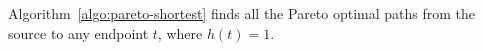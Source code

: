 \begin{comment}
Lastly, let us prove the correctness of Algorithm~\ref{algo:pareto-shortest}. Given a recourse point $t$, we need to establish two key points:

\begin{enumerate}
    \item  All pareto optimal paths from $s$ to $t$ are present in the pareto table $D^\eta_t$.
    \item  All paths in the pareto table $D^\eta_t$ are pareto optimal.
\end{enumerate}

The second statement is clearly true since the prune step is to compare the path one by one and delete the path if it is dominated. To prove the first statement, consider a path $Q$ which is pareto optimal but it is not included in $D^\eta_t$ in the end. If the number of edges in $Q$ is one, in the first iteration it must can be found when examining $(s,t)$ of line 7 and be included in $D^1_t$. It would not be deleted in $D^\ell_t$ in any iteration $\ell, \ell>1$ neither. The reason is that all the cost functions are aggregation functions and each cost only monotonically increase. Thus, if $Q$ is pareto optimal in the end, it is still pareto optimal in any iterations too. Now, assume the statement is true for path $Q$ with the number of edges less than $a,a>1$. Consider the case when path $Q$ with $a+1$ number of edges, say $i$ is the second last point in $Q$. If the subpath $s \rightsquigarrow i$ is not pareto optimal, we must can find one path that dominates this subpath in table $D^{a}_i$ since it records all pareto optimal paths from $s$ to $i$. Thus, by replacing the subpath to the pareto optimal one, we only decrease the cost of $Q$ for any cost function, which shows $Q$ is dominates by this new path, which is a contradiction. On the other hand, If the subpath $s \rightsquigarrow i$ is pareto optimal, it must be included in $D^{a}_i$ and would not be pruned in $D^{a+1}_i$ because the pareto optimality of $Q$. Thus, the first argument is proved by induction.



\end{comment}
\begin{theorem}
    Algorithm~\ref{algo:pareto-shortest} finds all the Pareto optimal paths from the source to any endpoint $t$, where $h(t)=1$.
\end{theorem}

